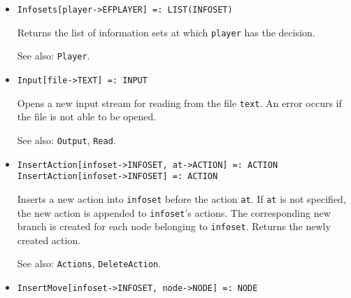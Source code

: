 \begin{itemize}
\item{}
\protect \large \begin{verbatim}
Infosets[player->EFPLAYER] =: LIST(INFOSET) 
\end{verbatim}\normalsize

\bd
Returns the list of information sets at which 
\verb+player+ has the decision.
\item [See also:] \verb+Player+.
\ed

\item{}
\protect \large \begin{verbatim}
Input[file->TEXT] =: INPUT 
\end{verbatim}\normalsize

\bd
Opens a new input stream for reading from the file \verb+text+.  An
error occurs if the file is not able to be opened.
\item
[See also:]  \verb+Output+, \verb+Read+.
\ed



\item{}
\protect \large \begin{verbatim}
InsertAction[infoset->INFOSET, at->ACTION] =: ACTION 
InsertAction[infoset->INFOSET] =: ACTION 
\end{verbatim}\normalsize

\bd
Inserts a new action into \verb+infoset+ before the action \verb+at+.  
If \verb+at+ is not specified, the new action is appended to \verb+infoset+'s
actions.
The corresponding new branch is created for
each node belonging to \verb+infoset+.  Returns the newly created action.
\item
[See also:] \verb+Actions+, \verb+DeleteAction+.
\ed

\item{}
\protect \large \begin{verbatim}
InsertMove[infoset->INFOSET, node->NODE] =: NODE 
\end{verbatim}\normalsize


\end{itemize}
